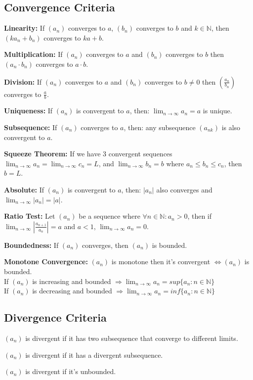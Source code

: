 \documentclass[8pt,a4paper]{extarticle}     %
\theoremstyle{definition}
\theoremstyle{definition}
\theoremstyle{definition}
\newcommand{\N}{\mathbb{N}}
\begin{document}
\begin{multicols}{4}
\subsection{Convergence Criteria}
\begin{eqlist}
	\item \textbf{Linearity:} If $(a_n)$ converges to $a$, $(b_n)$ converges to $b$ and $k\in\N$, then $(ka_n+b_n)$ converges to $ka+b$.
	\item \textbf{Multiplication:} If $(a_n)$ converges to $a$ and $(b_n)$ converges to $b$ then $(a_n\cdot b_n)$ converges to $a\cdot b$.
	\item \textbf{Division:} If $(a_n)$ converges to $a$ and $(b_n)$ converges to $b\neq0$ then $(\frac{a_n}{b_n})$ converges to $\frac{a}{b}$.
	\item \textbf{Uniqueness:} If $(a_n)$ is convergent to $a$, then: $\lim_{n\to\infty}a_n = a$ is unique.
	\item \textbf{Subsequence:} If $(a_n)$ converges to $a$, then: any subsequence $(a_{nk})$ is also convergent to $a$.
	\item \textbf{Squeeze Theorem: }If we have 3 convergent sequences $\lim_{n\to\infty}a_n=\lim_{n\to\infty}c_n=L$, and $\lim_{n\to\infty}b_n=b$ where $a_n\leq b_n \leq c_n$, then $b=L$.
	\item \textbf{Absolute:} If $(a_n)$ is convergent to $a$, then: $|a_n|$ also converges and $\lim_{n\to\infty}|a_n|=|a|$.
	\item \textbf{Ratio Test:} Let $(a_n)$ be a sequence where $\forall n\in\N: a_n>0$, then if $\lim_{n\to\infty}\left|\frac{a_{n+1}}{a_n}\right| = a$ and $a<1$, $\lim_{n\to\infty}a_n = 0$.
	\item \textbf{Boundedness:} If $(a_n)$ converges, then $(a_n)$ is bounded.
	\item \textbf{Monotone Convergence:} $(a_n)$ is monotone then it's convergent $\Leftrightarrow (a_n)$ is bounded. \\
	If $(a_n)$ is increasing and bounded $\Rightarrow \lim_{n\to\infty}a_n= sup\{a_n: n\in\N\}$ \\
	If $(a_n)$ is decreasing and bounded $\Rightarrow \lim_{n\to\infty}a_n= inf\{a_n: n\in\N\}$
\end{eqlist}
\subsection{Divergence Criteria}
\begin{eqlist}
	\item $(a_n)$ is divergent if it has two subsequence that converge to different limits.
	\item $(a_n)$ is divergent if it has a divergent subsequence.
	\item $(a_n)$ is divergent if it's unbounded.
\end{eqlist}


\end{multicols}
\end{document}
